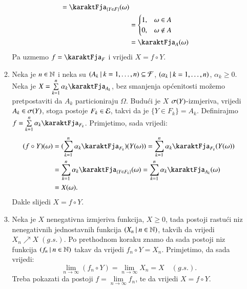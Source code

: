 \begin{rj}[\ref{zad:3.20}]
\begin{itemize}
\begin{enumerate}[label=(\arabic*. korak)]
\begin{equation*}
\begin{aligned}
                    = \karaktFja_{\{Y \in F\}} (\omega)\\
                    &=
                    \begin{cases}
                        1, &\omega \in A\\
                        0, &\omega \notin A
                    \end{cases}\\
                    &= \karaktFja_A (\omega)
                \end{aligned}
            \end{equation*}
            Pa uzmemo $f = \karaktFja_F$ i vrijedi $X = f \circ Y$.
            \item Neka je $n \in \mathbb{N}$ i neka su $({A_k} \: | \: {k = 1, \ldots, n}) \subseteq \mathcal{F}$, $({\alpha_k} \: | \: {k = 1, \ldots, n})$, $\alpha_k \geq 0$.
            Neka je $X = \suma{k = 1}{n} \alpha_k \karaktFja_{A_k}$, bez smanjenja op\' cenitosti mo\v zemo pretpostaviti da $A_k$ particioniraju $\Omega$.
            Budu\' ci je $X$ $\sigma({Y})$-izmjeriva, vrijedi $A_k \in \sigma({Y})$, stoga postoje $F_k \in \mathcal{E}$, takvi da je $\{Y \in F_k\} = A_k$.
            Definirajmo $f = \suma{k = 1}{n} \alpha_k \karaktFja_{F_k}$.
            Primjetimo, sada vrijedi:
            \begin{equation*}
                \begin{aligned}
                    (f \circ Y)(\omega) &= (\suma{k = 1}{n} \alpha_k \karaktFja_{F_k})(Y(\omega)) = \suma{k = 1}{n} \alpha_k \karaktFja_{F_k} (Y(\omega))\\
                    &= \suma{k = 1}{n} \alpha_k \karaktFja_{\{Y \in F_k\}} (\omega) = \suma{k = 1}{n} \alpha_k \karaktFja_{A_k} (\omega)\\
                    &= X (\omega).
                \end{aligned}
            \end{equation*}
            Dakle slijedi $X = f \circ Y$.
            \item Neka je $X$ nenegativna izmjeriva funkcija, $X \geq 0$, tada postoji rastu\' ci niz nenegativnih jednostavnih funkcija $({X_n} \: | \: {n \in \mathbb{N}})$, takvih da vrijedi $X_n \nearrow X \; (g.s.)$.
            Po prethodnom koraku znamo da sada postoji niz funkcija $({f_n} \: | \: {n \in \mathbb{N}})$ takav da vrijedi $f_n \circ Y = X_n$.
            Primjetimo, da sada vrijedi:
            \begin{equation*}
                \lim\limits_{n \to \infty} (f_n \circ Y) = \lim\limits_{n \to \infty} X_n = X \quad (g.s.).
            \end{equation*}
            Treba pokazati da postoji $f = \lim\limits_{n \to \infty} f_n$, te da vrijedi $X = f \circ Y$.


\end{enumerate}
\end{itemize}
\end{rj}
